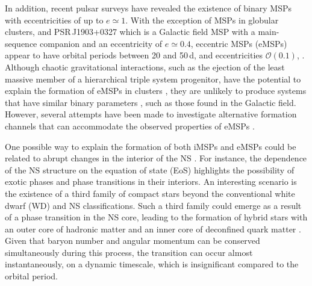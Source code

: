 \documentclass[main.tex]{subfiles}
\begin{document}
    In addition, recent pulsar surveys have revealed the existence of binary MSPs with eccentricities of up to $e \simeq 1$. With
    the exception of MSPs in globular clusters, and PSR\,J1903+0327 \citep{Champion:sci2008} which is a Galactic field MSP with a
    main-sequence companion and an eccentricity of $e\simeq0.4$, 
     eccentric MSPs (eMSPs) appear to have orbital periods between 20 and 50\,d, and eccentricities $\mathcal{O}(0.1)$, 
     \citep{Deneva:apj2013, Barr:mnras2013, Knispel:apj2015, Camilo:apj2015, antoniadis:apjl14, Antoniadis:2016bnj,  Stovall:apj2019}. 
    Although chaotic gravitational interactions, such as the ejection of the least massive member of a hierarchical triple system
    progenitor, have the potential to explain the formation of eMSPs in clusters \citep[e.g.,][]{2011MNRAS.412.2763F, 
    2011ApJ...734...55P},   they are unlikely to produce systems that have similar binary parameters \citep[see][]
    {Deneva:apj2013, Barr:mnras2013, Knispel:apj2015, Camilo:apj2015, Octau:aap2018}, such as those found in the Galactic field. 
    However, several attempts have been made to investigate alternative formation channels that can accommodate the observed properties of eMSPs \citep[e.g., see ][for an overivew of various eMSP formation scenarios]{Freire:mnras14, antoniadis:apjl14, Jiang:apj15, Jiang:raa2021, ginzburg:mnras21}. 
    
    One possible way to explain the formation of both iMSPs and eMSPs could be related to abrupt changes in the interior of the NS \citep{Freire:mnras14, Jiang:apj15, Alvarez-Castillo:2019apz}. For instance, the dependence of the NS structure on the equation of state (EoS) highlights the possibility of exotic phases and phase transitions in their interiors. An interesting scenario is the existence of a third family of compact stars \citep[hencheforth ``twin stars''; see][]{Gerlach:1968zz}
    beyond the conventional  white dwarf (WD) and NS classifications. 
    Such a third family could emerge as a result of a phase transition in the NS core, leading to the formation of hybrid stars with an outer core of hadronic matter and an inner core of deconfined quark matter \citep[e.g.,][]
    {Schertler:2000xq,Benic:2014jia, Alvarez-Castillo:2019apz, 2021AN....342..234A}. 
    Given that baryon number and angular momentum can be conserved simultaneously during this process, the transition can occur almost instantaneously, on a dynamic timescale, which is insignificant compared to the orbital period.
    
\end{document}
